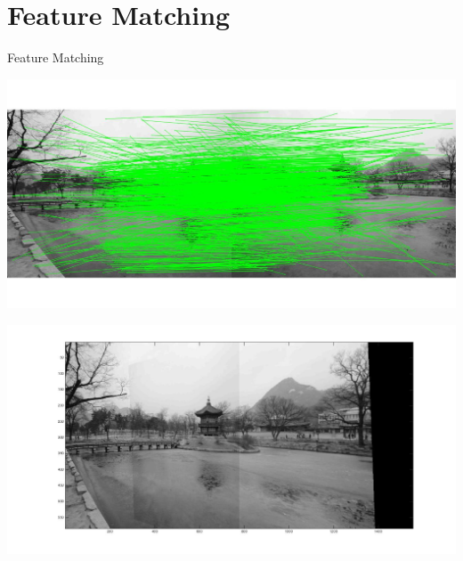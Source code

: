 \documentclass{beamer}
\begin{document}
\section{Feature Matching}

\begin{frame}{Feature Matching}

  \centering\includegraphics[height=.4\textheight]{Images/sift.jpg}

  \begin{centering}
  \includegraphics[height=.4\textheight]{Images/panorama.jpg}
  \end{centering}
\end{frame}
\end{document}
